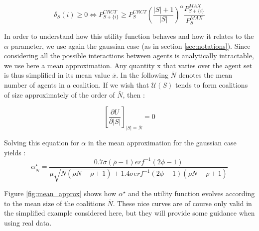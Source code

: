\documentclass[conference]{IEEEtran}
\begin{document}
\begin{equation}
\delta_{S}(i) \geq 0 \Leftrightarrow P_{S+\{i\}}^{CRCT} \geq P_{S}^{CRCT} \left( \dfrac{|S|+1}{|S|} \right)^{\alpha} \dfrac{P_{S + \{i\}}^{MAX}}{P_{S}^{MAX}}
\label{eq:marginal_benefit}
\end{equation}

In order to understand how this utility function behaves and how it relates to the $ \alpha $ parameter, we use again the gaussian case (as in section \ref{sec:notations}). Since considering all the possible interactions between agents is analytically intractable, we use here a mean approximation. Any quantity x that varies over the agent set is thus simplified in its mean value $ \bar{x} $. In the following $ \bar{N} $ denotes the mean number of agents in a coalition. If we wish that $ \mathcal{U}(S) $ tends to form coalitions of size approximately of the order of $ \bar{N} $, then :

\begin{equation}
\left[ \dfrac{\partial{ U}}{ \partial{|S|}} \right]_{|S| = \bar{N}} = 0
\end{equation}

Solving this equation for $ \alpha $ in the mean approximation for the gaussian case yields :
\footnotesize
\begin{equation}
\alpha^{\star}_{\bar{N}} = \dfrac{0.7 \bar{\sigma}(\bar{\rho}-1)erf^{-1}(2 \phi - 1)}{\bar{\mu}\sqrt{\bar{N}(\bar{\rho}\bar{N}-\bar{\rho}+1)}+1.4 \bar{\sigma} erf^{-1} (2 \phi -1 ) (\bar{\rho}\bar{N}-\bar{\rho} + 1)} 
\label{eq:alpha_star}
\end{equation}
\normalsize

Figure \ref{fig:mean_approx} shows how $ \alpha^{\star} $ and the utility function evolves according to the mean size of the coalitions $ \bar{N} $. These nice curves are of course only valid in the simplified example considered here, but they will provide some guidance when using real data.
\end{document}
